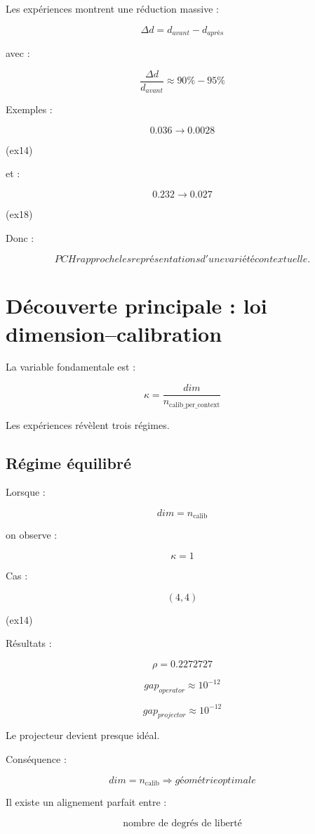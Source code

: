 \documentclass[11pt]{article}
\begin{document}
Les expériences montrent une réduction massive :

\[
\Delta d =
d_{avant}-d_{après}
\]


avec :

\[
\frac{\Delta d}{d_{avant}}
\approx 90\%-95\%
\]


Exemples :


\[
0.036\rightarrow0.0028
\]


(ex14)


et :

\[
0.232\rightarrow0.027
\]


(ex18)


Donc :

\[
\boxed{
PCH rapproche les représentations d'une variété contextuelle.
}
\]


\section{Découverte principale :
loi dimension--calibration}


La variable fondamentale est :

\[
\kappa=
\frac{dim}{n_{\mathrm{calib\_per\_context}}}
\]


Les expériences révèlent trois régimes.


\subsection{Régime équilibré}


Lorsque :

\[
dim=n_{\mathrm{calib}}
\]


on observe :

\[
\kappa=1
\]


Cas :

\[
(4,4)
\]

(ex14)


Résultats :

\[
\rho=0.2272727
\]


\[
gap_{operator}\approx10^{-12}
\]


\[
gap_{projector}\approx10^{-12}
\]


Le projecteur devient presque idéal.


Conséquence :

\[
\boxed{
dim=n_{\mathrm{calib}}
\Rightarrow
géométrie optimale
}
\]


Il existe un alignement parfait entre :

\[
\text{nombre de degrés de liberté}
\]
\end{document}
